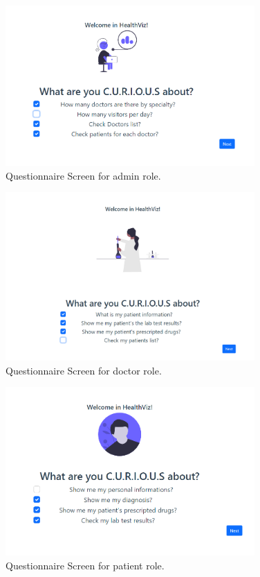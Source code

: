 \begin{itemize}
     \begin{figure}[h!]
          \center
          \includegraphics[width=0.85\textwidth]{images/chapter4/application/needadmin.PNG}
          \caption{Questionnaire Screen for admin role.}
      \end{figure}
      \begin{figure}[h!]
          \center
          \includegraphics[width=0.85\textwidth]{images/chapter4/application/needDoc.PNG}
          \caption{Questionnaire Screen for doctor role.}
        \end{figure}
        \begin{figure}[h!]
          \center
          \includegraphics[width=0.85\textwidth]{images/chapter4/application/needUser.PNG}
          \caption{Questionnaire Screen for patient role.}
    \end{figure}


\end{itemize}
